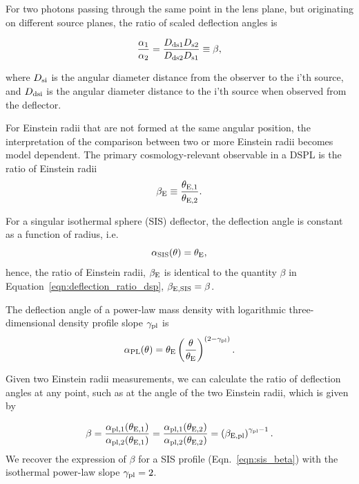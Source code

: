 \documentclass[a4paper,11pt]{article}
\begin{document}
For two photons passing through the same point in the lens plane, but originating on different source planes, the ratio of scaled deflection angles is

\begin{equation} \label{eqn:deflection_ratio_dsp}
 \frac{\alpha_1}{\alpha_2} = \frac{D_{\rm ds1}D_{\rm s2}}{D_{\rm ds2}D_{\rm s1}} \equiv \beta,
\end{equation}

where $D_{\rm si}$ is the angular diameter distance from the observer to the i'th source, and $D_{\rm dsi}$ is the angular diameter distance to the i'th source when observed from the deflector.

For Einstein radii that are not formed at the same angular position, the interpretation of the comparison between two or more Einstein radii becomes model dependent. The primary cosmology-relevant observable in a DSPL is the ratio of Einstein radii
\begin{equation}
    \beta_{\rm E} \equiv \frac{\theta_{\rm E, 1}}{\theta_{\rm E, 2}}.
\end{equation}

For a singular isothermal sphere (SIS) deflector, the deflection angle is constant as a function of radius, i.e.
\begin{equation}\label{eqn:sis_beta}
 \alpha_{\rm SIS}(\theta) = \theta_{\rm E},  
\end{equation}
hence, the ratio of Einstein radii, $ \beta_{\rm E}$ is identical to the quantity $\beta$ in Equation~\ref{eqn:deflection_ratio_dsp}, $\beta_{\rm E, SIS} = \beta$.

The deflection angle of a power-law mass density with logarithmic three-dimensional density profile slope $\gamma_{\rm pl}$ is 
\begin{equation} \label{eqn:power_law_deflection}
 \alpha_{\rm PL}(\theta) = \theta_{\rm E}  \left(\frac{\theta}{\theta_{\rm E}}\right)^{\left(2 - \gamma_{\rm pl}\right)}.
\end{equation}

Given two Einstein radii measurements, we can calculate the ratio of deflection angles at any point, such as at the angle of the two Einstein radii, which is given by

\begin{equation} \label{eqn:beta_gamma_scaling}
    \beta = \frac{\alpha_{\rm{pl}, 1}(\theta_{\rm{E}, 1})}{\alpha_{\rm{pl}, 2}(\theta_{\rm{E}, 1})} = \frac{\alpha_{\rm{pl}, 1}(\theta_{\rm{E}, 2})}{\alpha_{\rm{pl}, 2}(\theta_{\rm{E}, 2})} = \left(\beta_{\rm E, pl} \right)^{\gamma_{\rm{pl}}-1}.
\end{equation}
We recover the expression of $\beta$ for a SIS profile (Eqn.~\ref{eqn:sis_beta}) with the isothermal power-law slope $\gamma_{\rm pl} = 2$.
\end{document}
